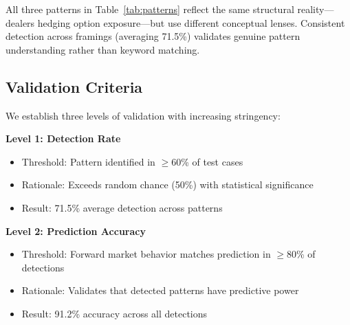\begin{table}[h]
\centering
\caption{Three Pattern Framings of Dealer Hedging Constraints}
\label{tab:patterns}
\end{table}

All three patterns in Table~\ref{tab:patterns} reflect the same structural reality—dealers hedging option exposure—but use different conceptual lenses. Consistent detection across framings (averaging 71.5\%) validates genuine pattern understanding rather than keyword matching.

\subsection{Validation Criteria}

We establish three levels of validation with increasing stringency:

\textbf{Level 1: Detection Rate}
\begin{itemize}
\item Threshold: Pattern identified in $\geq$60\% of test cases
\item Rationale: Exceeds random chance (50\%) with statistical significance
\item Result: 71.5\% average detection across patterns
\end{itemize}

\textbf{Level 2: Prediction Accuracy}
\begin{itemize}
\item Threshold: Forward market behavior matches prediction in $\geq$80\% of detections
\item Rationale: Validates that detected patterns have predictive power
\item Result: 91.2\% accuracy across all detections
\end{itemize}

